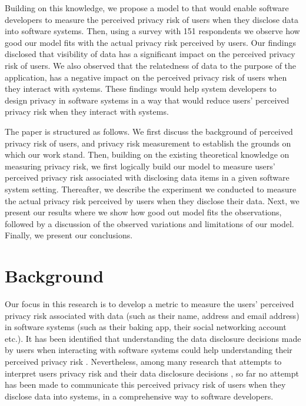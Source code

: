 \documentclass[10pt]{article}
\begin{document}
Building on this knowledge, we propose a model to that would enable software developers to measure the perceived privacy risk of users when they disclose data into software systems. Then, using a survey with 151 respondents we observe how good our model fits with the actual privacy risk perceived by users. Our findings disclosed that visibility of data has a significant impact on the perceived privacy risk of users. We also observed that the relatedness of data to the purpose of the application, has a negative impact on the perceived privacy risk of users when they interact with systems. These findings would help system developers to design privacy in software systems in a way that would reduce users' perceived privacy risk when they interact with systems. 

The paper is structured as follows. We first discuss the background of perceived privacy risk of users, and privacy risk measurement to establish the grounds on which our work stand. Then, building on the existing theoretical knowledge on measuring privacy risk, we first logically build our model to measure users' perceived privacy risk associated with disclosing data items in a given software system setting. Thereafter, we describe the experiment we conducted to measure the actual privacy risk perceived by users when they disclose their data. Next, we present our results where we show how good out model fits the observations, followed by a discussion of the observed variations and limitations of our model. Finally, we present our conclusions.

\section {Background}

Our focus in this research is to develop a metric to measure the users' perceived privacy risk associated with data (such as their name, address and email address) in software systems (such as their baking app, their social networking account etc.). It has been identified that understanding the data disclosure decisions made by users when interacting with software systems could help understanding their perceived privacy risk \cite {kobsa2007privacy, li2010understanding, malhotra2004internet}. Nevertheless, among many research that attempts to interpret users privacy risk and their data disclosure decisions \cite {knijnenburg2013making, li2010understanding, wang2016context, malheiros2013fairly, dennett2000little}, so far no attempt has been made to communicate this perceived privacy risk of users when they disclose data into systems, in a comprehensive way to software developers. 
\end{document}
